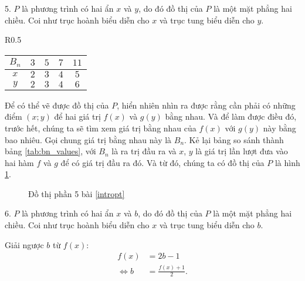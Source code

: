 5. $P$ là phương trình có hai ẩn $x$ và $y$, do đó đồ thị của $P$ là một mặt phẳng hai chiều. Coi như trục hoành biểu diễn cho $x$ và trục tung biểu diễn cho $y$. 

\begin{wraptable}{R}{0.5\textwidth}
   \centering
   \begin{tabular}{|c|c|c|c|c|}
      \hline
      $B_n$ & $3$ & $5$ & $7$ & $11$ \\
      \hline
      $x$ & $2$ & $3$ & $4$ & $5$ \\
      \hline
      $y$ & $2$ & $3$ & $4$ & $6$ \\
      \hline 
   \end{tabular}
   \caption{Giá trị của $x$ và $y$ ứng với $B_n$}
   \label{tab:bn_values}
\end{wraptable}

Để có thể vẽ được đồ thị của $P$, hiển nhiên nhìn ra được rằng cần phải có những điểm $(x;y)$ để hai giá trị $f(x)$ và $g(y)$ bằng nhau. Và để làm được điều đó, trước hết, chúng ta sẽ tìm xem giá trị bằng nhau của $f(x)$ với $g(y)$ này bằng bao nhiêu. Gọi chung giá trị bằng nhau này là $B_n$. Kẻ lại bảng so sánh thành bảng \ref{tab:bn_values}, với $B_n$ là ra trị đầu ra và $x$, $y$ là giá trị lần lượt đưa vào hai hàm $f$ và $g$ để có giá trị đầu ra đó. Và từ đó, chúng ta có đồ thị của $P$ là hình \ref{fig:dtp5}.

\begin{figure}[h]
   \centering
   \caption{Đồ thị phần 5 bài \ref{intropt}}
   \label{fig:dtp5}
\end{figure}

6. $P$ là phương trình có hai ẩn $x$ và $b$, do đó đồ thị của $P$ là một mặt phẳng hai chiều. Coi như trục hoành biểu diễn cho $x$ và trục tung biểu diễn cho $b$.

Giải ngược $b$ từ $f(x)$:
\begin{align*}
   f(x) &= 2b - 1 \\
   \iff b &= \frac{f(x) + 1}{2}.
\end{align*}

